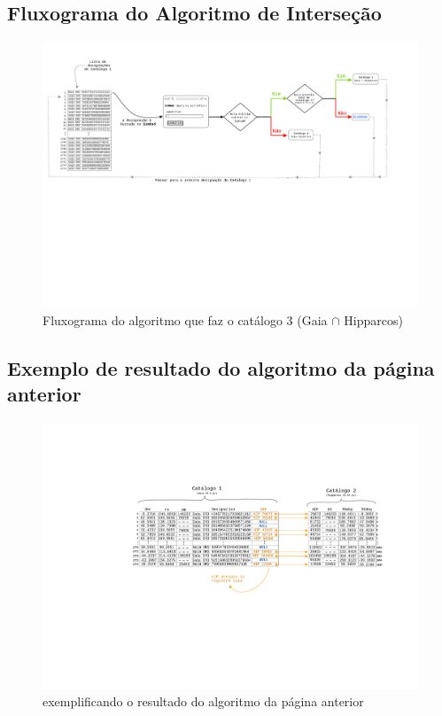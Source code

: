 \documentclass{article}
\begin{document}
	\newpage
	\begin{center}
	\section*{\small Fluxograma do Algoritmo de Interseção}
	\end{center}
	\vspace{50pt}	
	
	
	\begin{figure}[h]
		\centering
		\includegraphics[width=\textwidth, trim = 0cm 9cm 0cm 1cm, clip]{diagramintersection.pdf}
		\caption*{Fluxograma do algoritmo que faz o catálogo 3 (Gaia $\cap$ Hipparcos)}
	\end{figure}

	\newpage
	\begin{center}
		\section*{\small Exemplo de resultado do algoritmo da página anterior}
	\end{center}
	\vspace{50pt}	
	
	
	\begin{figure}[h]
		\centering
		\includegraphics[width=\textwidth, trim = 7.1cm 7.5cm 2.8cm 5cm, clip]{exemplificando.pdf}
		\caption*{exemplificando o resultado do algoritmo da página anterior}
	\end{figure}
	
	
\end{document}
